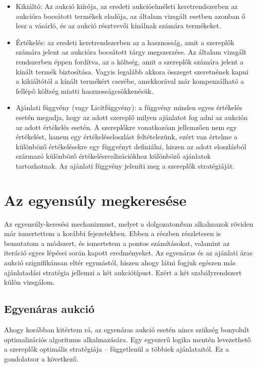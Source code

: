 \documentclass[twoside, magyar, showtrims]{corvinusphd}
\theoremstyle{plain}
\theoremstyle{remark}
\theoremstyle{definition}
\begin{document}
\begin{itemize}
    \item
    Kikiáltó: Az aukció kiírója, az eredeti aukcióelméleti keretrendszerben
az aukcióra bocsátott termékek eladója, az általam vizsgált esetben
azonban ő lesz a vásárló, és az aukció résztvevői kínálnak számára termékeket.
    \item
    Értékelés: az eredeti keretrendszerben az a hasznosság, amit a szereplők számára
jelent az aukcióra bocsátott tárgy megszerzése. Az általam vizsgált rendszerben éppen fordítva,
az a költség, amit a szereplők számára jelent a kínált termék biztosítása.
Vagyis legalább akkora összeget szeretnének kapni a kikiáltótól a kínált termékért cserébe,
amekkorával már kompenzálható a fellépő költség miatti hasznosságcsökkenésük.
    \item
    Ajánlati függvény (vagy Licitfüggvény): a függvény minden egyes értékelés esetén
megadja, hogy az adott szereplő milyen ajánlatot fog adni az aukción az adott értékelés esetén.
A szereplőkre vonatkozóan jellemzően nem egy értékelést, hanem egy értékeléseloszlást feltételezünk,
ezért van értelme a különböző értékelésekre egy függvényt definiálni, hiszen az adott eloszlásból
származó különböző értékelésrealizációkhoz különböző ajánlatok tartozhatnak.
Az ajánlati függvény jeleníti meg a szereplők stratégiáját.   
\end{itemize}

\chapter{Az egyensúly megkeresése}
\label{Nash}

\scwords Az egyensúly-keresési mechanizmust,
melyet a dolgozatomban alkalmazok
röviden már ismertettem a korábbi fejezetekben. Ebben a részben
részletesen is bemutatom a módszert, és ismertetem a pontos számításokat,
valamint az iteráció egyes lépései során kapott eredményeket.
Az egyenáras és az ajánlati áras aukció szignifikánsan eltér egymástól,
hiszen ahogy látni fogjuk egészen más ajánlatadási stratégia jellemzi a két aukciótípust.
Ezért a két szabályrendszert külön vizsgálom.

\section{Egyenáras aukció}\label{uniform}

Ahogy korábban kitértem rá, az egyenáras aukció esetén nincs szükség
bonyolult optimalizációs algoritmus alkalmazására. 
Egy egyszerű logika mentén levezethető a szereplők
optimális stratégiája -- függetlenül a többiek ajánlataitól.
Ez a gondolatsor a következő.
\end{document}
